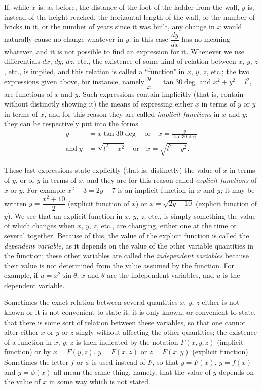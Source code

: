\documentclass{ximera}
\begin{document}
If, while $x$ is, as before, the distance of the foot
of the ladder from the wall, $y$ is, instead of the
height reached, the horizontal length of the wall, or
the number of bricks in it, or the number of years
since it was built, any change in $x$ would naturally
cause no change whatever in $y$; in this case $\dfrac{dy}{dx}$ has
no meaning whatever, and it is not possible to find an expression for it. Whenever we use differentials
$dx$, $dy$, $dz$, etc., the existence of some kind of
relation between $x$, $y$, $z$, etc., is implied, and this
relation is called a ``function" in $x$, $y$, $z$, etc.; the
two expressions given above, for instance, namely
$\dfrac{y}{x} = \tan 30 \deg$ and $x^2 + y^2 = l^2$, are functions of $x$ and $y$.
Such expressions contain implicitly (that is, contain
without distinctly showing it) the means of expressing
either $x$ in terms of $y$ or $y$ in terms of $x$, and for
this reason they are called \textit{implicit functions} in
$x$ and $y$; they can be respectively put into the forms
\begin{align*}
y &= x \tan 30\deg \quad\text{or}\quad x = \frac{y}{\tan 30 \deg} \\
 \text{and}\;
y &= \sqrt{ l^2 - x^2} \quad\text{or}\quad x = \sqrt{ l^2 - y^2}.
\end{align*}

These last expressions state explicitly (that is, distinctly)
the value of $x$ in terms of $y$, or of $y$ in terms
of $x$, and they are for this reason called \textit{explicit
functions} of $x$ or $y$. For example $x^2 + 3 = 2y - 7$ is
an implicit function in $x$ and $y$; it may be written
$y = \dfrac{x^2 + 10}{2}$ (explicit function of $x$) or $x = \sqrt{2y - 10}$
(explicit function of $y$). We see that an explicit
function in $x$, $y$, $z$, etc., is simply something the
value of which changes when $x$, $y$, $z$, etc., are
changing, either one at the time or several together.
Because of this, the value of the explicit function is
called the \textit{dependent variable}, as it depends on the
value of the other variable quantities in the function; these other variables are called the \textit{independent
variables} because their value is not determined from
the value assumed by the function. For example,
if $u = x^2 \sin \theta$, $x$ and $\theta$ are the independent variables,
and $u$ is the dependent variable.

Sometimes the exact relation between several
quantities $x$, $y$, $z$ either is not known or it is not
convenient to state it; it is only known, or convenient
to state, that there is some sort of relation
between these variables, so that one cannot alter
either $x$ or $y$ or $z$ singly without affecting the other
quantities; the existence of a function in $x$, $y$, $z$ is
then indicated by the notation $F(x, y, z)$ (implicit
function) or by $x = F(y, z)$, $y = F(x, z)$ or $z = F(x, y)$
(explicit function). Sometimes the letter $f$ or $\phi$ is used
instead of $F$, so that $y = F(x)$, $y = f(x)$ and $y = \phi(x)$
all mean the same thing, namely, that the value of $y$
depends on the value of $x$ in some way which is
not stated.
\end{document}
